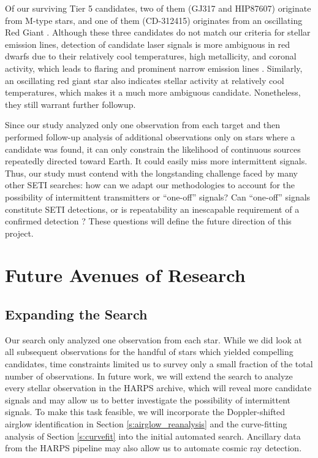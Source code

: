 \documentclass[twocolumn]{aastex701}
\begin{document}
Of our surviving Tier 5 candidates, two of them (GJ317 and HIP87607) originate from M-type stars, and one of them (CD-312415) originates from an oscillating Red Giant \citep{CD-312415_RED_GIANT}. Although these three candidates do not match our criteria for stellar emission lines, detection of candidate laser signals is more ambiguous in red dwarfs due to their relatively cool temperatures, high metallicity, and coronal activity, which leads to flaring and prominent narrow emission lines \citep{Marcy_2021}. Similarly, an oscillating red giant star also indicates stellar activity at relatively cool temperatures, which makes it a much more ambiguous candidate. Nonetheless, they still warrant further followup. 

Since our study analyzed only one observation from each target and then performed follow-up analysis of additional observations only on stars where a candidate was found, it can only constrain the likelihood of continuous sources repeatedly directed toward Earth.  It could easily miss more intermittent signals. Thus, our study must contend with the longstanding challenge faced by many other SETI searches: how can we adapt our methodologies to account for the possibility of intermittent transmitters or ``one-off'' signals?  Can ``one-off'' signals constitute SETI detections, or is repeatability an inescapable requirement of a confirmed detection \citep{2019nasatechnosignatures, Wow!Signal}? These questions will define the future direction of this project.


\section{Future Avenues of Research}
\subsection{Expanding the Search}
Our search only analyzed one observation from each star. While we did look at all subsequent observations for the handful of stars which yielded compelling candidates, time constraints limited us to survey only a small fraction of the total number of observations.  In future work, we will extend the search to analyze every stellar observation in the HARPS archive, which will reveal more candidate signals and may allow us to better investigate the possibility of intermittent signals. To make this task feasible, we will incorporate the Doppler-shifted airglow identification in Section \ref{s:airglow_reanalysis} and the curve-fitting analysis of Section \ref{s:curvefit} into the initial automated search. Ancillary data from the HARPS pipeline may also allow us to automate cosmic ray detection.
\end{document}
